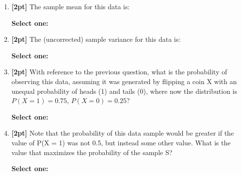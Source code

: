 \documentclass[12pt]{article}
\renewcommand{\circle}{\tikz\draw[black] (0,0) circle (1ex);}
\begin{document}
\begin{enumerate}
    \item \textbf{[2pt]} The sample mean for this data is:
    
    \textbf{Select one:}


    \item \textbf{[2pt]} The (uncorrected) sample variance for this data is:

    \textbf{Select one:}


    \item \textbf{[2pt]} With reference to the previous question, what is the probability of observing this data, assuming it was generated by flipping a coin X with an unequal probability of heads (1) and tails (0), where now the distribution is $P(X = 1) = 0.75$, $P(X = 0) = 0.25$?

    \textbf{Select one:}


    \item \textbf{[2pt]} Note that the probability of this data sample would be greater if the value of P(X = 1) was not 0.5, but instead some other value. What is the value that maximizes the probability of the sample S?

    \textbf{Select one:}



\end{enumerate}
\end{document}
